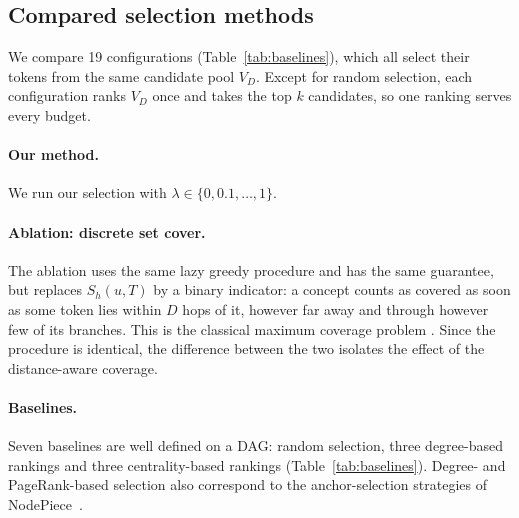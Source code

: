 \subsection{Compared selection methods}
\label{sec:method:baselines}

We compare 19 configurations (Table~\ref{tab:baselines}), which all select their tokens from the same candidate pool $V_D$.
Except for random selection, each configuration ranks $V_D$ once and takes the top $k$ candidates, so one ranking serves every budget.

\paragraph{Our method.} We run our selection with $\lambda \in \{0, 0.1, \dots, 1\}$.

\paragraph{Ablation: discrete set cover.}
The ablation uses the same lazy greedy procedure and has the same guarantee, but replaces $S_h(u, T)$ by a binary indicator: a concept counts as covered as soon as some token lies within $D$ hops of it, however far away and through however few of its branches.
This is the classical maximum coverage problem \cite{nemhauser1978analysis, feige1998threshold}.
Since the procedure is identical, the difference between the two isolates the effect of the distance-aware coverage.

\paragraph{Baselines.}
Seven baselines are well defined on a DAG: random selection, three degree-based rankings and three centrality-based rankings (Table~\ref{tab:baselines}).
Degree- and PageRank-based selection also correspond to the anchor-selection strategies of NodePiece~\cite{galkin2022nodepiece}.

